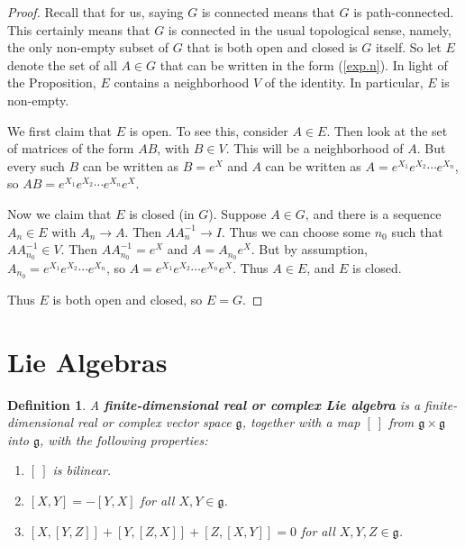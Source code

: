 \documentclass{amsbook}
\let \frak = \mathfrak
\theoremstyle{plain}
\newtheorem{definition}[theorem]{Definition}
\numberwithin{equation}{chapter}
\numberwithin{theorem}{chapter}
\begin{document}
\begin{proof}
Recall that for us, saying $G$ is connected means that $G$ is path-connected.
This certainly means that $G$ is connected in the usual topological sense,
namely, the only non-empty subset of $G$ that is both open and closed is $G$
itself. So let $E$ denote the set of all $A\in G$ that can be written in the
form (\ref{exp.n}). In light of the Proposition, $E$ contains a neighborhood
$V$ of the identity. In particular, $E$ is non-empty.

We first claim that $E$ is open. To see this, consider $A\in E$. Then look at
the set of matrices of the form $AB$, with $B\in V$. This will be a
neighborhood of $A$. But every such $B$ can be written as $B=e^{X}$ and $A$
can be written as $A=e^{X_{1}}e^{X_{2}}\cdots e^{X_{n}}$, so $AB=e^{X_{1}%
}e^{X_{2}}\cdots e^{X_{n}}e^{X}$.

Now we claim that $E$ is closed (in $G$). Suppose $A\in G$, and there is a
sequence $A_{n}\in E$ with $A_{n}\rightarrow A$. Then $AA_{n}^{-1}\rightarrow
I$. Thus we can choose some $n_{0}$ such that $AA_{n_{0}}^{-1}\in V$. Then
$AA_{n_{0}}^{-1}=e^{X}$ and $A=A_{n_{0}}e^{X}$. But by assumption, $A_{n_{0}%
}=e^{X_{1}}e^{X_{2}}\cdots e^{X_{n}}$, so $A=e^{X_{1}}e^{X_{2}}\cdots
e^{X_{n}}e^{X}$. Thus $A\in E$, and $E$ is closed.

Thus $E$ is both open and closed, so $E=G$.
\end{proof}

\section{Lie Algebras\label{algebras}}

\begin{definition}
A \textbf{finite-dimensional real or complex Lie algebra} is a
finite-dimensional real or complex vector space $\frak{g}$, together with a
map $\left[  \ \right]  $ from $\frak{g}\times\frak{g}$ into $\frak{g}$, with
the following properties:

\begin{enumerate}
\item $\left[  \ \right]  $ is bilinear.

\item \label{lie.skew}$\left[  X,Y\right]  =-\left[  Y,X\right]  $ for all
$X,Y\in\frak{g}$.

\item \label{jacobi}$\left[  X,\left[  Y,Z\right]  \right]  +\left[  Y,\left[
Z,X\right]  \right]  +\left[  Z,\left[  X,Y\right]  \right]  =0$ for all
$X,Y,Z\in\frak{g}$.
\end{enumerate}
\end{definition}
\end{document}
